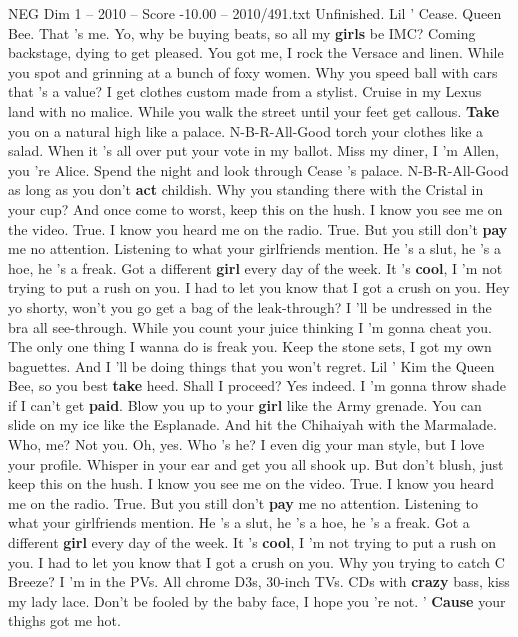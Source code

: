 \begin{textsample}{NEG Dim 1 – 2010 – Score -10.00 – 2010/491.txt}  \label{ex:f1_neg_025}
Unfinished.
Lil ' Cease.
Queen Bee.
That 's me.
Yo, why be buying beats, so all my \textbf{girls} be IMC?
Coming backstage, dying to get pleased.
You got me, I rock the Versace and linen.
While you spot and grinning at a bunch of foxy women.
Why you speed ball with cars that 's a value?
I get clothes custom made from a stylist.
Cruise in my Lexus land with no malice.
While you walk the street until your feet get callous. \textbf{Take} you on a natural high like a palace.
N-B-R-All-Good torch your clothes like a salad.
When it 's all over put your vote in my ballot.
Miss my diner, I 'm Allen, you 're Alice.
Spend the night and look through Cease 's palace.
N-B-R-All-Good as long as you don't \textbf{act} childish.
Why you standing there with the Cristal in your cup?
And once come to worst, keep this on the hush.
I know you see me on the video.
True.
I know you heard me on the radio.
True.
But you still don't \textbf{pay} me no attention.
Listening to what your girlfriends mention.
He 's a slut, he 's a hoe, he 's a freak.
Got a different \textbf{girl} every day of the week.
It 's \textbf{cool}, I 'm not trying to put a rush on you.
I had to let you know that I got a crush on you.
Hey yo shorty, won't you go get a bag of the leak-through?
I 'll be undressed in the bra all see-through.
While you count your juice thinking I 'm gonna cheat you.
The only one thing I wanna do is freak you.
Keep the stone sets, I got my own baguettes.
And I 'll be doing things that you won't regret.
Lil ' Kim the Queen Bee, so you best \textbf{take} heed.
Shall I proceed?
Yes indeed.
I 'm gonna throw shade if I can't get \textbf{paid}.
Blow you up to your \textbf{girl} like the Army grenade.
You can slide on my ice like the Esplanade.
And hit the Chihaiyah with the Marmalade.
Who, me?
Not you.
Oh, yes.
Who 's he?
I even dig your man style, but I love your profile.
Whisper in your ear and get you all shook up.
But don't blush, just keep this on the hush.
I know you see me on the video.
True.
I know you heard me on the radio.
True.
But you still don't \textbf{pay} me no attention.
Listening to what your girlfriends mention.
He 's a slut, he 's a hoe, he 's a freak.
Got a different \textbf{girl} every day of the week.
It 's \textbf{cool}, I 'm not trying to put a rush on you.
I had to let you know that I got a crush on you.
Why you trying to catch C Breeze?
I 'm in the PVs.
All chrome D3s, 30-inch TVs.
CDs with \textbf{crazy} bass, kiss my lady lace.
Don't be fooled by the baby face, I hope you 're not. ' \textbf{Cause} your thighs got me hot.

\end{textsample}
